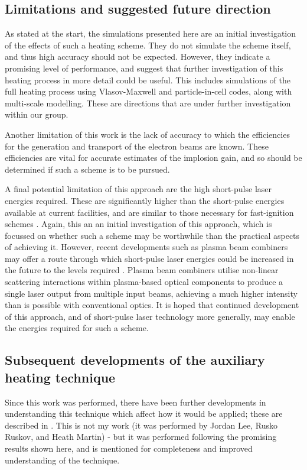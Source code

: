 \subsection{Limitations and suggested future direction}

As stated at the start, the simulations presented here are an initial investigation of the effects of such a heating scheme. They do not simulate the scheme itself, and thus high accuracy should not be expected. However, they indicate a promising level of performance, and suggest that further investigation of this heating process in more detail could be useful. This includes simulations of the full heating process using Vlasov-Maxwell and particle-in-cell codes, along with multi-scale modelling. These are directions that are under further investigation within our group.

Another limitation of this work is the lack of accuracy to which the efficiencies for the generation and transport of the electron beams are known. These efficiencies are vital for accurate estimates of the implosion gain, and so should be determined if such a scheme is to be pursued.

A final potential limitation of this approach are the high short-pulse laser energies required. These are significantly higher than the short-pulse energies available at current facilities, and are similar to those necessary for fast-ignition schemes \cite{Strozzi2012}. Again, this an an initial investigation of this approach, which is focussed on whether such a scheme may be worthwhile than the practical aspects of achieving it. However, recent developments such as plasma beam combiners \cite{Kirkwood2018,Kirkwood2018a} may offer a route through which short-pulse laser energies could be increased in the future to the levels required \cite{KirkwoodPersonalComm}. Plasma beam combiners utilise non-linear scattering interactions within plasma-based optical components to produce a single laser output from multiple input beams, achieving a much higher intensity than is possible with conventional optics. It is hoped that continued development of this approach, and of short-pulse laser technology more generally, may enable the energies required for such a scheme.

\subsection{Subsequent developments of the auxiliary heating technique}
Since this work was performed, there have been further developments in understanding this technique which affect how it would be applied; these are described in \cite{Lee2023}. This is not my work (it was performed by Jordan Lee, Rusko Ruskov, and Heath Martin) - but it was performed following the promising results shown here, and is mentioned for completeness and improved understanding of the technique.

